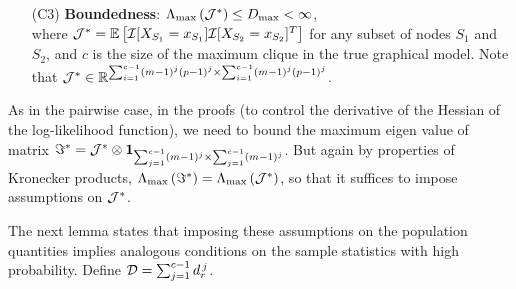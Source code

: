 \begin{itemize}
\item [(C3)] {\bf Boundedness}: $\Lambda_{\max}\left(\mathcal{J}^*\right)\leq D_{\max}<\infty$,\\

where $\mathcal{J}^*=\mathbb{E}\left[\mathcal{I}[X_{S_1}=x_{S_1}]\mathcal{I}[X_{S_2}=x_{S_2}]^T\right]$ for any subset of nodes $S_1$ and $S_2$, and $c$ is the size of the maximum clique in the true graphical model. Note that
$\mathcal{J}^*\in\mathbb{R}^{\sum_{i=1}^{c-1}(m-1)^j(p-1)^j\times\sum_{i=1}^{c-1}(m-1)^j(p-1)^j}$.
\end{itemize} 

\noindent As in the pairwise case, in the proofs (to control the derivative of the Hessian of the log-likelihood function), we need to bound the maximum eigen value of matrix $\Im^*=\mathcal{J}^*\otimes \mathbf{1}_{\sum_{j=1}^{c-1}(m-1)^j\times\sum_{j=1}^{c-1}(m-1)^j}$. But again by properties of Kronecker products, $\Lambda_{\max}\left(\Im^*\right)=\Lambda_{\max}\left(\mathcal{J}^*\right)$, so that it suffices to impose assumptions on $\mathcal{J}^*$.


The next lemma states that imposing these assumptions on the population quantities implies analogous conditions on the sample statistics with high probability. 
Define $\mathcal{D}=\sum_{j=1}^{c-1}d_{r}^{\,j}$.

